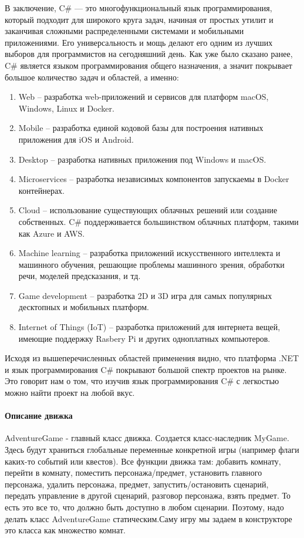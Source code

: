 В заключение, C\# — это многофункциональный язык программирования, который подходит для широкого круга задач, начиная от простых утилит и заканчивая сложными распределенными системами и мобильными приложениями. Его универсальность и мощь делают его одним из лучших выборов для программистов на сегодняшний день.
Как уже было сказано ранее, C\# является языком программирования общего назначения, а значит покрывает большое количество задач и областей, а именно:
\begin{enumerate}
	\item Web – разработка web-приложений и сервисов для платформ macOS, Windows, Linux и Docker.
	\item Mobile – разработка единой кодовой базы для построения нативных приложения для iOS и Android.
	\item Desktop – разработка нативных приложения под Windows и macOS.
	\item Microservices – разработка независимых компонентов запускаемы в Docker контейнерах.
	\item Cloud – использование существующих облачных решений или создание собственных. C\# поддерживается большинством облачных платформ, такими как Azure и AWS.
	\item Machine learning – разработка приложений искусственного интеллекта и машинного обучения, решающие проблемы машинного зрения, обработки речи, моделей предсказания, и тд.
	\item Game development – разработка 2D и 3D игра для самых популярных десктопных и мобильных платформ.
	\item Internet of Things (IoT) – разработка приложений для интернета вещей, имеющие поддержку Rasbery Pi и других одноплатных компьютеров.
\end{enumerate}

Исходя из вышеперечисленных областей применения видно, что платформа .NET и язык программирования C\# покрывают большой спектр проектов на рынке. Это говорит нам о том, что изучив язык программирования C\# с легкостью можно найти проект на любой вкус.

\paragraph{Описание движка}
AdventureGame - главный класс движка. Создается класс-наследник MyGame. Здесь будут храниться глобальные переменные конкретной игры (например флаги каких-то событий или квестов). Все функции движка там: добавить комнату, перейти в комнату, поместить персонажа/предмет, установить главного персонажа, удалить персонажа, предмет, запустить/остановить сценарий, передать управление в другой сценарий, разговор персонажа, взять предмет.
То есть это все то, что должно быть доступно в любом сценарии. Поэтому, надо делать класс AdventureGame статическим.Саму игру мы задаем в конструкторе это класса как множество комнат. 


